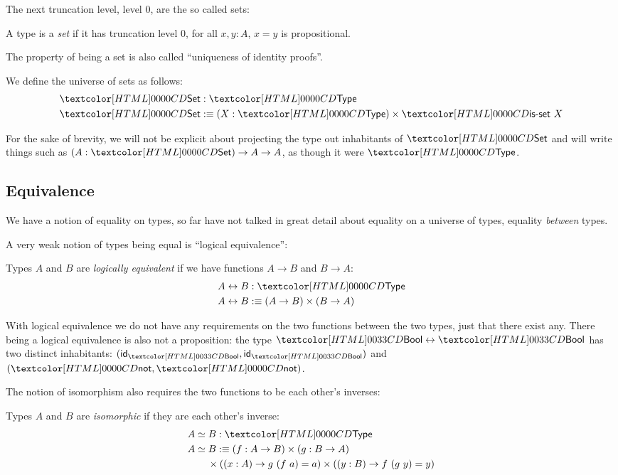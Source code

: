 The next truncation level, level $0$, are the so called sets:
\begin{definition}
  A type is a \emph{set} if it has truncation level $0$, \ie for all
  $x, y : A$, $x = y$ is propositional.
\end{definition}
The property of being a set is also called ``uniqueness of identity
proofs''.
\begin{definition}
  We define the universe of sets as follows:
  \begin{align*}
    &\Set : \Type \\
    &\Set \ddefeq (X : \Type) \times \isset\ X
  \end{align*}
\end{definition}

For the sake of brevity, we will not be explicit about projecting the
type out inhabitants of $\Set$ and will write things such as
$(A : \Set) \to A \to A$, as though it were $\Type$.

\subsection{Equivalence}

We have a notion of equality on types, so far have not talked in great
detail about equality on a universe of types, \ie equality
\emph{between} types.

A very weak notion of types being equal is ``logical equivalence'':
\begin{definition}
  Types $A$ and $B$ are \emph{logically equivalent} if we have
  functions $A \to B$ and $B \to A$:
  \begin{align*}
    &A \logequiv B : \Type \\
    &A \logequiv B \ddefeq (A \to B) \times (B \to A)
  \end{align*}
\end{definition}

With logical equivalence we do not have any requirements on the two
functions between the two types, just that there exist any. There
being a logical equivalence is also not a proposition: the type
$\boolty \logequiv \boolty$ has two distinct inhabitants:
$(\id_{\boolty} , \id_{\boolty})$ and $(\boolnot , \boolnot)$.

The notion of isomorphism also requires the two functions to be
each other's inverses:
\begin{definition}[Isomorphism]
  Types $A$ and $B$ are \emph{isomorphic} if they are each other's
  inverse:
  \begin{align*}
    &\Iso{A}{B} : \Type \\
    &\Iso{A}{B} \ddefeq (f : A \to B) \times (g : B \to A)  \\
    &\ \ \ \ \ \ \times ((x : A) \to g\ (f\ a) = a) \times ((y : B) \to f\ (g\ y) = y)
  \end{align*}
\end{definition}

